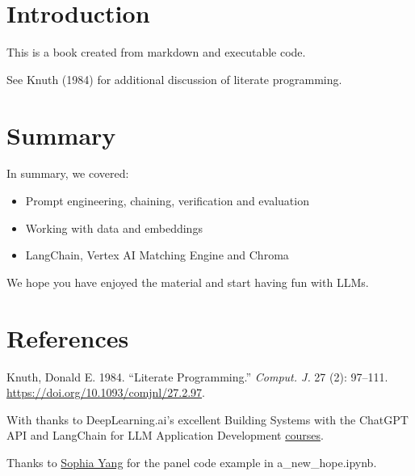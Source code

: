 \documentclass[
  letterpaper,
  DIV=11,
  numbers=noendperiod]{scrreprt}
\newlength{\cslhangindent}
\newlength{\cslentryspacingunit} %
\newenvironment{CSLReferences}[2] %
 {%
  \setlength{\parindent}{0pt}
  \ifodd #1
  \let\oldpar\par
  \def\par{\hangindent=\cslhangindent\oldpar}
  \fi
  \setlength{\parskip}{#2\cslentryspacingunit}
 }%
 {}
\begin{document}

\hypertarget{introduction}{%
\chapter{Introduction}\label{introduction}}

This is a book created from markdown and executable code.

See Knuth (1984) for additional discussion of literate programming.


\hypertarget{summary}{%
\chapter{Summary}\label{summary}}

In summary, we covered:

\begin{itemize}
\item
  Prompt engineering, chaining, verification and evaluation
\item
  Working with data and embeddings
\item
  LangChain, Vertex AI Matching Engine and Chroma
\end{itemize}

We hope you have enjoyed the material and start having fun with LLMs.


\hypertarget{references}{%
\chapter*{References}\label{references}}


\hypertarget{refs}{}
\begin{CSLReferences}{1}{0}
\leavevmode{}%
Knuth, Donald E. 1984. {``Literate Programming.''} \emph{Comput. J.} 27
(2): 97--111. \url{https://doi.org/10.1093/comjnl/27.2.97}.

\end{CSLReferences}

With thanks to DeepLearning.ai's excellent Building Systems with the
ChatGPT API and LangChain for LLM Application Development
\href{https://www.deeplearning.ai/short-courses/}{courses}.

Thanks to
\href{https://github.com/sophiamyang/tutorials-LangChain}{Sophia Yang}
for the panel code example in a\_new\_hope.ipynb.
\end{document}

